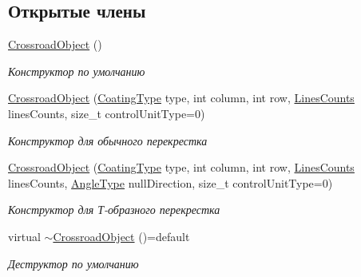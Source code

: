 \subsection*{Открытые члены}
\begin{DoxyCompactItemize}
\item 
\mbox{\label{classrtm_1_1_crossroad_object_a07fd0e5feeca4e6226dd6043ad9175af}} 
\hyperlink{classrtm_1_1_crossroad_object_a07fd0e5feeca4e6226dd6043ad9175af}{Crossroad\+Object} ()
\begin{DoxyCompactList}\small\item\em Конструктор по умолчанию \end{DoxyCompactList}\item 
\hyperlink{classrtm_1_1_crossroad_object_a370ec11e5fd53f2191fb107a8fe2a5d5}{Crossroad\+Object} (\hyperlink{namespacertm_aecd3929e64cd461eb3555b611f6fad95}{Coating\+Type} type, int column, int row, \hyperlink{namespacertm_a14457f3088a92b86a96686b72d3e4eea}{Lines\+Counts} lines\+Counts, size\+\_\+t control\+Unit\+Type=0)
\begin{DoxyCompactList}\small\item\em Конструктор для обычного перекрестка \end{DoxyCompactList}\item 
\hyperlink{classrtm_1_1_crossroad_object_a8a76233b7cff3b017ad67bbf5e11a5d3}{Crossroad\+Object} (\hyperlink{namespacertm_aecd3929e64cd461eb3555b611f6fad95}{Coating\+Type} type, int column, int row, \hyperlink{namespacertm_a14457f3088a92b86a96686b72d3e4eea}{Lines\+Counts} lines\+Counts, \hyperlink{namespacertm_a69dc82b16a0148c10962caa83d930f89}{Angle\+Type} null\+Direction, size\+\_\+t control\+Unit\+Type=0)
\begin{DoxyCompactList}\small\item\em Конструктор для Т-\/образного перекрестка \end{DoxyCompactList}\item 
\mbox{\label{classrtm_1_1_crossroad_object_a7e004fc5c59d1fd2b2bea0babcd52abe}} 
virtual \hyperlink{classrtm_1_1_crossroad_object_a7e004fc5c59d1fd2b2bea0babcd52abe}{$\sim$\+Crossroad\+Object} ()=default
\begin{DoxyCompactList}\small\item\em Деструктор по умолчанию \end{DoxyCompactList}\item 

\end{DoxyCompactItemize}
